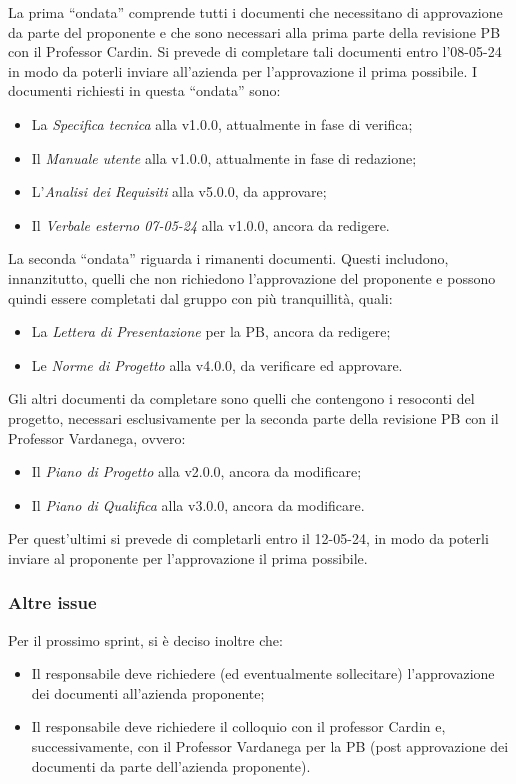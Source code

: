 \bigskip
\noindent La prima ``ondata'' comprende tutti i documenti che necessitano di approvazione da parte del proponente e che sono necessari alla prima parte della revisione PB con il Professor Cardin. Si prevede di completare tali documenti entro l'08-05-24 in modo da poterli inviare all'azienda per l'approvazione il prima possibile. I documenti richiesti in questa ``ondata'' sono:
\begin{itemize}
    \item La \textit{Specifica tecnica} alla v1.0.0, attualmente in fase di verifica;
    \item Il \textit{Manuale utente} alla v1.0.0, attualmente in fase di redazione;
    \item L'\textit{Analisi dei Requisiti} alla v5.0.0, da approvare;
    \item Il \textit{Verbale esterno 07-05-24} alla v1.0.0, ancora da redigere.
\end{itemize}

\bigskip
\noindent La seconda ``ondata'' riguarda i rimanenti documenti. Questi includono, innanzitutto, quelli che non richiedono l'approvazione del proponente e possono quindi essere completati dal gruppo con più tranquillità, quali:
\begin{itemize}
    \item La \textit{Lettera di Presentazione} per la PB, ancora da redigere;
    \item Le \textit{Norme di Progetto} alla v4.0.0, da verificare ed approvare.
\end{itemize}
Gli altri documenti da completare sono quelli che contengono i resoconti del progetto, necessari esclusivamente per la seconda parte della revisione PB con il Professor Vardanega, ovvero:
\begin{itemize}
    \item Il \textit{Piano di Progetto} alla v2.0.0, ancora da modificare;
    \item Il \textit{Piano di Qualifica} alla v3.0.0, ancora da modificare.
\end{itemize}
Per quest'ultimi si prevede di completarli entro il 12-05-24, in modo da poterli inviare al proponente per l'approvazione il prima possibile.

\subsubsection{Altre issue}
Per il prossimo sprint, si è deciso inoltre che:
\begin{itemize}
    \item Il responsabile deve richiedere (ed eventualmente sollecitare) l'approvazione dei documenti all'azienda proponente;
    \item Il responsabile deve richiedere il colloquio con il professor Cardin e, successivamente, con il Professor Vardanega per la PB (post approvazione dei documenti da parte dell'azienda proponente).
\end{itemize}

